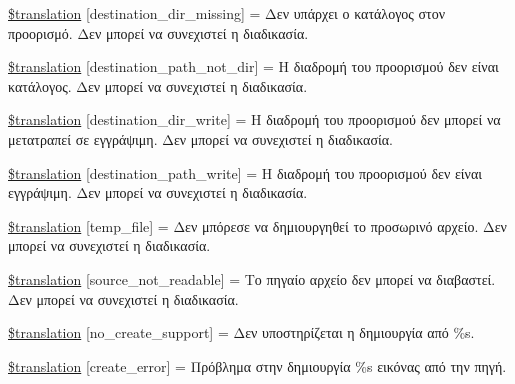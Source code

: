 \begin{DoxyCompactItemize}
\item 
\hyperlink{class_8upload_8el___g_r_8php_a9ef28d3cf09942c6c0a1e77fa09185e8}{\$translation} \mbox{[}\textquotesingle{}destination\+\_\+dir\+\_\+missing\textquotesingle{}\mbox{]} = \textquotesingle{}Δεν υπάρχει ο κατάλογος στον προορισμό. Δεν μπορεί να συνεχιστεί η διαδικασία.\textquotesingle{}
\item 
\hyperlink{class_8upload_8el___g_r_8php_a5704a67137126e8c87b7a364175929d4}{\$translation} \mbox{[}\textquotesingle{}destination\+\_\+path\+\_\+not\+\_\+dir\textquotesingle{}\mbox{]} = \textquotesingle{}Η διαδρομή του προορισμού δεν είναι κατάλογος. Δεν μπορεί να συνεχιστεί η διαδικασία.\textquotesingle{}
\item 
\hyperlink{class_8upload_8el___g_r_8php_a97608ea194a616db49141a0e6dee900c}{\$translation} \mbox{[}\textquotesingle{}destination\+\_\+dir\+\_\+write\textquotesingle{}\mbox{]} = \textquotesingle{}Η διαδρομή του προορισμού δεν μπορεί να μετατραπεί σε εγγράψιμη. Δεν μπορεί να συνεχιστεί η διαδικασία.\textquotesingle{}
\item 
\hyperlink{class_8upload_8el___g_r_8php_a40e4e1962226b89fd76da5819a9602b0}{\$translation} \mbox{[}\textquotesingle{}destination\+\_\+path\+\_\+write\textquotesingle{}\mbox{]} = \textquotesingle{}Η διαδρομή του προορισμού δεν είναι εγγράψιμη. Δεν μπορεί να συνεχιστεί η διαδικασία.\textquotesingle{}
\item 
\hyperlink{class_8upload_8el___g_r_8php_a2baece8da11e20d45175db91851ec3e3}{\$translation} \mbox{[}\textquotesingle{}temp\+\_\+file\textquotesingle{}\mbox{]} = \textquotesingle{}Δεν μπόρεσε να δημιουργηθεί το προσωρινό αρχείο. Δεν μπορεί να συνεχιστεί η διαδικασία.\textquotesingle{}
\item 
\hyperlink{class_8upload_8el___g_r_8php_a922967ca2df0efdd455261142d8e5715}{\$translation} \mbox{[}\textquotesingle{}source\+\_\+not\+\_\+readable\textquotesingle{}\mbox{]} = \textquotesingle{}Το πηγαίο αρχείο δεν μπορεί να διαβαστεί. Δεν μπορεί να συνεχιστεί η διαδικασία.\textquotesingle{}
\item 
\hyperlink{class_8upload_8el___g_r_8php_a346dfd1ade29f583dd20d345c436859f}{\$translation} \mbox{[}\textquotesingle{}no\+\_\+create\+\_\+support\textquotesingle{}\mbox{]} = \textquotesingle{}Δεν υποστηρίζεται η δημιουργία από \%s.\textquotesingle{}
\item 
\hyperlink{class_8upload_8el___g_r_8php_a53013ce9255c4e1849098ddd9fdb2b3f}{\$translation} \mbox{[}\textquotesingle{}create\+\_\+error\textquotesingle{}\mbox{]} = \textquotesingle{}Πρόβλημα στην δημιουργία \%s εικόνας από την πηγή.\textquotesingle{}

\end{DoxyCompactItemize}
